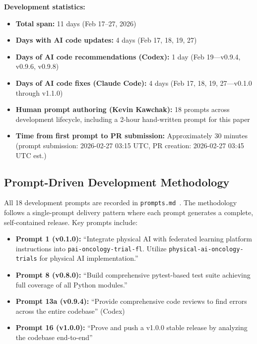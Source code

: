 \documentclass[10pt]{article}
\begin{document}
\textbf{Development statistics:}
\begin{itemize}
  \item \textbf{Total span:} 11 days (Feb 17--27, 2026)
  \item \textbf{Days with AI code updates:} 4 days (Feb 17, 18, 19, 27)
  \item \textbf{Days of AI code recommendations (Codex):} 1 day (Feb 19---v0.9.4, v0.9.6, v0.9.8)
  \item \textbf{Days of AI code fixes (Claude Code):} 4 days (Feb 17, 18, 19, 27---v0.1.0 through v1.1.0)
  \item \textbf{Human prompt authoring (Kevin Kawchak):} 18 prompts across development lifecycle, including a 2-hour hand-written prompt for this paper
  \item \textbf{Time from first prompt to PR submission:} Approximately 30 minutes (prompt submission: 2026-02-27 03:15 UTC, PR creation: 2026-02-27 03:45 UTC est.)
\end{itemize}

\subsection{Prompt-Driven Development Methodology}

All 18 development prompts are recorded in \texttt{prompts.md}~\cite{kawchak2026fl}. The methodology follows a single-prompt delivery pattern where each prompt generates a complete, self-contained release. Key prompts include:
\begin{itemize}
  \item \textbf{Prompt 1 (v0.1.0):} ``Integrate physical AI with federated learning platform instructions into \texttt{pai-oncology-trial-fl}. Utilize \texttt{physical-ai-oncology-trials} for physical AI implementation.''
  \item \textbf{Prompt 8 (v0.8.0):} ``Build comprehensive pytest-based test suite achieving full coverage of all Python modules.''
  \item \textbf{Prompt 13a (v0.9.4):} ``Provide comprehensive code reviews to find errors across the entire codebase'' (Codex)
  \item \textbf{Prompt 16 (v1.0.0):} ``Prove and push a v1.0.0 stable release by analyzing the codebase end-to-end''
\end{itemize}
\end{document}
